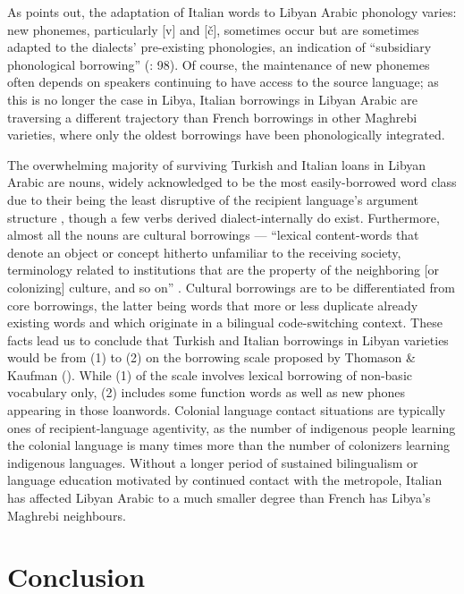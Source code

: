 \documentclass[output=paper]{langsci/langscibook}
\begin{document}
  As \citet{Danna2018phonetic} points out, the adaptation of Italian words to Libyan Arabic phonology varies: new phonemes, particularly  [v] and [č], sometimes occur but are sometimes adapted to the dialects’ pre-existing phonologies, an indication of “subsidiary phonological borrowing” (\citealt{VanCoetsem1988}: 98). Of course, the maintenance of new phonemes often depends on speakers continuing to have access to the source language; as this is no longer the case in Libya, Italian borrowings in Libyan Arabic are traversing a different trajectory than French borrowings in other Maghrebi varieties, where only the oldest borrowings have been phonologically integrated.

  The overwhelming majority of surviving Turkish and Italian loans in Libyan Arabic are nouns, widely acknowledged to be the most easily-borrowed word class due to their being the least disruptive of the recipient language’s argument structure \citep{Myers-Scotton2002}, though a few verbs derived dialect-internally do exist. Furthermore, almost all the nouns are cultural borrowings — “lexical content-words that denote an object or concept hitherto unfamiliar to the receiving society, terminology related to institutions that are the property of the neighboring [or colonizing] culture, and so on” \citep[210]{Matras2011universals}. Cultural borrowings are to be differentiated from core borrowings, the latter being words that more or less duplicate already existing words and which originate in a bilingual code-switching context. These facts lead us to conclude that Turkish and Italian borrowings in Libyan varieties would be from (1) to (2) on the borrowing scale proposed by Thomason \& Kaufman (\citeyear[78–83]{ThomasonKaufman1988}). While (1) of the scale involves lexical borrowing of non-basic vocabulary only, (2) includes some function words as well as new phones appearing in those loanwords. Colonial language contact situations are typically ones of recipient-language agentivity, as the number of indigenous people learning the colonial language is many times more than the number of colonizers learning indigenous languages. Without a longer period of sustained bilingualism or language education motivated by continued contact with the metropole, Italian has affected Libyan Arabic to a much smaller degree than French has Libya's Maghrebi neighbours.

\section{Conclusion}
\end{document}
